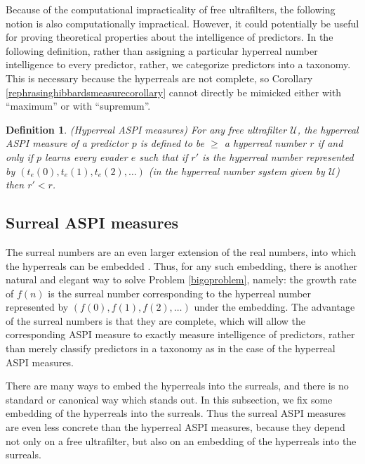 \documentclass{article}
\newtheorem{definition}[theorem]{Definition}
\begin{document}
Because of the computational impracticality of free ultrafilters, the following notion
is also computationally impractical. However, it could potentially be useful for
proving theoretical properties about the intelligence of predictors. In the following
definition, rather than assigning a particular hyperreal number intelligence to every
predictor, rather, we categorize predictors into a taxonomy. This is necessary because
the hyperreals are not complete, so Corollary \ref{rephrasinghibbardsmeasurecorollary}
cannot directly be mimicked either with ``maximum'' or with ``supremum''.

\begin{definition}
\label{hyperrealhibbardintelligencedefn}
    (Hyperreal ASPI measures)
    For any free ultrafilter $\mathcal U$,
    the \emph{hyperreal ASPI measure} of a predictor $p$ is defined to be
    $\geq$ a hyperreal number $r$ if and only if $p$ learns every evader $e$
    such that if $r'$ is the hyperreal number represented by
    $(t_e(0), t_e(1), t_e(2), \ldots)$ (in the hyperreal number system given
    by $\mathcal U$) then $r'<r$.
\end{definition}

\subsection{Surreal ASPI measures}

The surreal numbers \cite{conway} \cite{knuth} are an even larger extension
of the real numbers, into which the hyperreals can be embedded
\cite{ehrlich2012absolute}.
Thus, for any such embedding,
there is another natural and elegant way to solve Problem \ref{bigoproblem},
namely: the growth rate of $f(n)$ is the surreal number corresponding to the
hyperreal number represented by $(f(0),f(1),f(2),\ldots)$ under the embedding.
The advantage of the surreal numbers is that they are complete, which will allow
the corresponding ASPI measure to exactly measure intelligence of predictors,
rather than merely classify predictors in a taxonomy as in the case of
the hyperreal ASPI measures.

There are many ways to embed the hyperreals into the surreals, and there is no
standard or canonical way which stands out. In this subsection, we fix some embedding
of the hyperreals into the surreals. Thus the surreal ASPI measures are even less
concrete than the hyperreal ASPI measures, because they depend not only on a
free ultrafilter, but also on an embedding of the hyperreals into the surreals.
\end{document}
